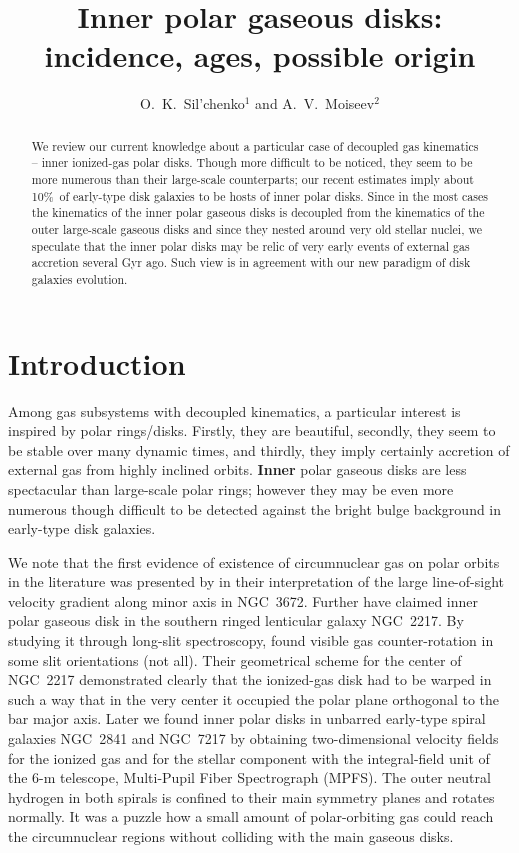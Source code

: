 \documentclass[11pt,twoside]{article}
\begin{document}
\title{Inner polar gaseous disks: incidence, ages, possible origin}
\author{O.~K.~Sil'chenko$^1$ and A.~V.~Moiseev$^2$
}

\begin{abstract}
We review our current knowledge about a particular case of decoupled gas kinematics --
inner ionized-gas polar disks. Though more difficult to be noticed, they seem to be more
numerous than their large-scale counterparts; our recent estimates imply about 10\%\ of
early-type disk galaxies to be hosts of inner polar disks. Since in the most cases the
kinematics of the inner polar gaseous disks is decoupled from the kinematics of the outer
large-scale gaseous disks and since they nested around very old stellar nuclei, we speculate
that the inner polar disks may be  relic of very early events of external gas accretion several 
Gyr ago. Such view is in agreement with our new paradigm of disk galaxies evolution. 
\end{abstract}

\section{Introduction}

Among gas subsystems with decoupled kinematics, a particular interest is inspired by
polar rings/disks. Firstly, they are beautiful, secondly, they seem to be stable
over many dynamic times, and thirdly, they imply certainly accretion of external gas from highly
inclined orbits. \textbf{Inner} polar gaseous disks are less spectacular than large-scale 
polar rings; however
they may be even more numerous though difficult to be detected against the bright bulge background
in early-type disk galaxies.


We note that the first evidence of existence of circumnuclear gas on polar orbits in the 
literature was presented by \citet*{Rubin1977} in their interpretation of the large line-of-sight 
velocity gradient along minor axis in NGC~3672. Further \citet*{bettoni90} have claimed inner polar 
gaseous disk in  the  southern ringed lenticular galaxy NGC~2217. By studying it through long-slit 
spectroscopy, \citet{bettoni90} found visible gas counter-rotation in some slit orientations (not all). 
Their geometrical scheme for the center of NGC~2217 demonstrated clearly that the ionized-gas disk had 
to be warped in such a way that in the very center it occupied the polar plane orthogonal
to the bar major axis. Later we found inner polar disks in unbarred early-type spiral
galaxies NGC~2841 \citep*{n2841pr} and NGC~7217 \citep{n7217pr} by obtaining two-dimensional
velocity fields for the ionized gas and for the stellar component with the integral-field
unit of the 6-m telescope, Multi-Pupil Fiber Spectrograph (MPFS).
The outer neutral hydrogen in both spirals is confined
to their main symmetry planes and rotates normally. It was a puzzle how a small amount of
polar-orbiting gas could reach the circumnuclear regions without colliding with the main
gaseous disks.
\end{document}
